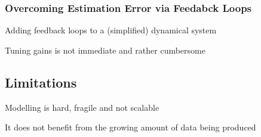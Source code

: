 
\subsubsection{Overcoming Estimation Error via Feedabck Loops}

Adding feedback loops to a (simplified) dynamical system

Tuning gains is not immediate and rather cumbersome

\subsection{Limitations}

Modelling is hard, fragile and not scalable

It does not benefit from the growing amount of data being produced

